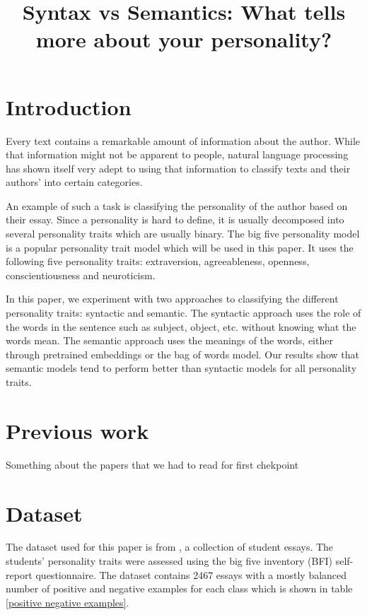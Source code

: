 \documentclass[10pt, a4paper]{article}
\title{Syntax vs Semantics: What tells more about your personality?}
\begin{document}
\maketitleabstract

\section{Introduction}

Every text contains a remarkable amount of information about the author.
While that information might not be apparent to people, natural language processing has shown itself very adept to using that information to classify texts and their authors' into certain categories.

An example of such a task is classifying the personality of the author based on their essay.
Since a personality is hard to define, it is usually decomposed into several personality traits which are usually binary.
The big five personality model is a popular personality trait model which will be used in this paper.
It uses the following five personality traits: extraversion, agreeableness, openness, conscientiousness and neuroticism.

In this paper, we experiment with two approaches to classifying the different personality traits: syntactic and semantic.
The syntactic approach uses the role of the words in the sentence such as subject, object, etc. without knowing what the words mean.
The semantic approach uses the meanings of the words, either through pretrained embeddings or the bag of words model.
Our results show that semantic models tend to perform better than syntactic models for all personality traits.

\section{Previous work}
Something about the papers that we had to read for first chekpoint

\section{Dataset}

The dataset used for this paper is from \cite{pennebaker}, a collection of student essays.
The students' personality traits were assessed using the big five inventory (BFI) self-report questionnaire.
The dataset contains 2467  essays with a mostly balanced number of positive and negative examples for each class which is shown in table \ref{positive negative examples}.
\end{document}
